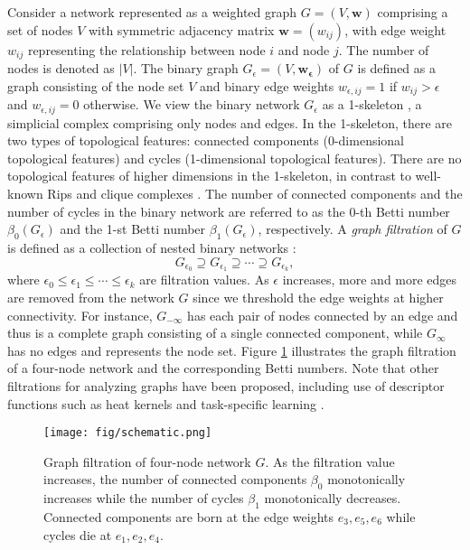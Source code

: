 \documentclass{article} %
\begin{document}
Consider a network represented as a weighted graph $G=(V,\bm{w})$ comprising a set of nodes $V$ with symmetric adjacency matrix $\bm{w}=(w_{ij})$,
with edge weight $w_{ij}$ representing the relationship between node $i$ and node $j$.
The number of nodes is denoted as $|V|$.
The binary graph $G_\epsilon=(V,\bm{w_\epsilon})$ of $G$ is defined as a graph consisting of the node set $V$ and binary edge weights $w_{\epsilon,ij} =1$ if $w_{ij} > \epsilon$ and $w_{\epsilon,ij} = 0$ otherwise.
We view the binary network $G_{\epsilon}$ as a 1-skeleton \citep{munkres2018elements}, a simplicial complex comprising only nodes and edges. In the 1-skeleton, there are two types of topological features: connected components (0-dimensional topological features) and cycles (1-dimensional topological features). There are no topological features of higher dimensions in the 1-skeleton, in contrast to well-known Rips \citep{ghrist2008barcodes} and clique complexes \citep{otter2017roadmap}.
The number of connected components and the number of
cycles in the binary network are referred to as the 0-th Betti number $\beta_0(G_{\epsilon})$ and the 1-st Betti number $\beta_1(G_{\epsilon})$, respectively. A {\em graph filtration} of $G$ is defined as a collection of nested binary networks \citep{lee2012persistent}:
\[G_{\epsilon_0} \supseteq G_{\epsilon_1} \supseteq \cdots \supseteq G_{\epsilon_k} ,\]
where $\epsilon_0 \leq \epsilon_1 \leq \cdots \leq \epsilon_k$ are filtration values.
As $\epsilon$ increases, more and more edges are removed from the network $G$ since we threshold the edge weights at higher connectivity.
For instance, $G_{-\infty}$ has each pair of nodes connected by an edge and thus is a complete graph consisting of a single connected component, while $G_{\infty}$ has no edges and represents the node set. Figure \ref{fig:schematic} illustrates the graph filtration of a four-node network and the corresponding Betti numbers. Note that other filtrations for analyzing graphs have been proposed, including use of descriptor functions such as heat kernels \citep{carriere2020perslay} and task-specific learning \citep{hofer2020graph}.


\begin{figure}
\centering
\texttt{[image: fig/schematic.png]}
\caption{Graph filtration of four-node network $G$. As the filtration value increases, the number of connected components $\beta_0$ monotonically increases while the number of cycles $\beta_1$ monotonically decreases. Connected components are born at the edge weights $e_3,e_5,e_6$ while cycles die at $e_1,e_2,e_4$.}
\label{fig:schematic}
\end{figure}
\end{document}
